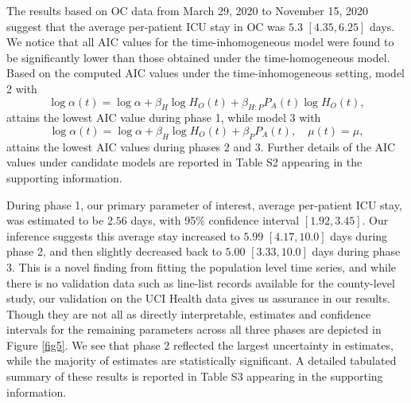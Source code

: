 \documentclass{article}
\begin{document}
The results based on OC data from March 29, 2020 to November 15, 2020 suggest that the average per-patient ICU stay in OC was $5.3$ $[4.35, 6.25]$ days. We notice that all AIC values for the time-inhomogeneous model were found to be significantly lower than those obtained under the time-homogeneous model. Based on the computed AIC values under the time-inhomogeneous setting, model 2 with
$$\log{\alpha(t)} = \log{\alpha} + \beta_{H} \log{H_{O}(t)} + \beta_{H:P}P_{A}(t)\log{H_{O}(t)},$$
attains the lowest AIC value during phase 1, while model 3 with
$$\log{\alpha(t)} = \log{\alpha} + \beta_{H} \log{H_{O}(t)} + \beta_{P}P_{A}(t), \quad \mu(t) = \mu,$$
attains the lowest AIC values during phases $2$ and $3$. Further details of the AIC values under candidate models are reported in Table S2 appearing in the supporting
information. \par

During phase 1, our primary parameter of interest, average per-patient ICU stay, was estimated to be $2.56$ days, with 95\% confidence interval $[1.92, 3.45]$. Our inference suggests this average stay increased to $5.99$ $[4.17, 10.0]$ days during phase 2, and then slightly decreased back to $5.00$ $[3.33, 10.0]$ days during phase 3. This is a novel finding from fitting the population level time series, and while there is no validation data such as line-list records available for the county-level study, our validation on the UCI Health data gives us assurance in our results.  Though they are not all as directly interpretable, estimates and confidence intervals for the remaining parameters across all three phases are depicted in Figure \ref{fig5}. We see that phase 2 reflected the largest uncertainty in estimates, while the majority of estimates are statistically significant. A detailed tabulated summary of these results is reported in Table S3 appearing in the supporting information.
\end{document}
